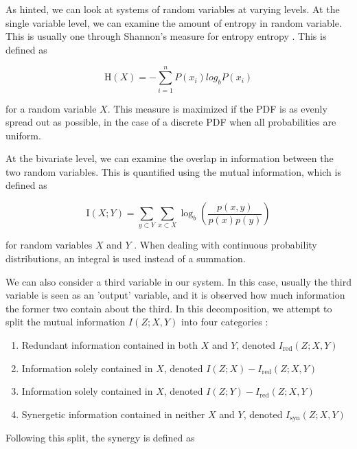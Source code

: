 \documentclass[../main.tex]{subfiles}
\begin{document}
As hinted, we can look at systems of random variables at varying levels.
At the single variable level, we can examine the amount of entropy in random variable.
This is usually one through Shannon's measure for entropy entropy \cite{shannon1949mathematical}.
This is defined as 

\begin{equation}
\mathrm{H}(X) = -\sum^n_{i=1} P(x_i) log_b P(x_i)
\end{equation}

for a random variable $X$. 
This measure is maximized if the PDF is as evenly spread out as possible, in the case of a discrete PDF when all probabilities are uniform.

At the bivariate level, we can examine the overlap in information between the two random variables.
This is quantified using the mutual information, which is defined as 

\begin{equation}
\mathrm{I}(X;Y) = \sum_{y \subset Y} \sum_{x \subset X} \log_b (\frac{p(x,y)}{p(x) p(y)})
\end{equation}

for random variables $X$ and $Y$ \cite{cover2012elements}.
When dealing with continuous probability distributions, an integral is used instead of a summation.

We can also consider a third variable in our system.
In this case, usually the third variable is seen as an 'output' variable, and it is observed how much information the former two contain about the third.
In this decomposition, we attempt to split the mutual information $I(Z;X,Y)$ into four categories \cite{williams2010nonnegative}:

\begin{enumerate}
\item Redundant information contained in both $X$ and $Y$, denoted $I_\mathrm{red}(Z;X,Y)$
\item Information solely contained in $X$, denoted $I(Z; X) - I_\mathrm{red}(Z;X,Y)$
\item Information solely contained in $X$, denoted $I(Z; Y) - I_\mathrm{red}(Z;X,Y)$
\item Synergetic information contained in neither $X$ and $Y$, denoted $I_\mathrm{syn}(Z;X,Y)$
\end{enumerate}

Following this split, the synergy is defined as
\end{document}
